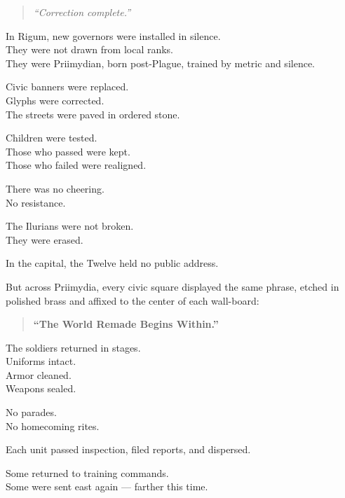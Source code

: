 \documentclass[9pt]{article}
\begin{document}
\begin{quote}
\textit{“Correction complete.”}
\end{quote}

\vspace{1em}

In Rigum, new governors were installed in silence.\\
They were not drawn from local ranks.\\
They were Priimydian, born post-Plague, trained by metric and silence.

Civic banners were replaced.\\
Glyphs were corrected.\\
The streets were paved in ordered stone.

Children were tested.\\
Those who passed were kept.\\
Those who failed were realigned.

\vspace{1em}

There was no cheering.\\
No resistance.

The Ilurians were not broken.\\
They were erased.

\vspace{1em}

In the capital, the Twelve held no public address.

But across Priimydia, every civic square displayed the same phrase, etched in polished brass and affixed to the center of each wall-board:

\begin{quote}
\textbf{“The World Remade Begins Within.”}
\end{quote}

\vspace{1em}

The soldiers returned in stages.\\
Uniforms intact.\\
Armor cleaned.\\
Weapons sealed.

No parades.\\
No homecoming rites.

Each unit passed inspection, filed reports, and dispersed.

\vspace{1em}

Some returned to training commands.\\
Some were sent east again — farther this time.
\end{document}
